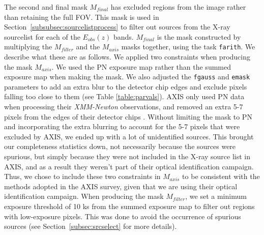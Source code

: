 \documentclass[fleqn,usenatbib]{mnras}
\begin{document}
        The second and final mask $M_{final}$ has excluded regions from the image rather than retaining the full FOV.
        This mask is used in Section~\ref{subsubsec:sourcelistprocess} to filter out sources from the X-ray sourcelist for each of the $E_{obs}(z)$ bands.
        $M_{final}$ is the mask constructed by multiplying the $M_{filter}$ and the $M_{axis}$ masks together, using the task \texttt{farith}.
        We describe what these are as follows.
        We applied two constraints when producing the mask $M_{axis}$.
        We used the PN exposure map rather than the summed exposure map when making the mask. 
        We also adjusted the \texttt{fgauss} and \texttt{emask} parameters to add an extra blur to the detector chip edges and exclude pixels falling too close to them (see Table \ref{table:parvals}). 
        AXIS only used PN data when processing their \textit{XMM-Newton} observations, and removed an extra 5-7 pixels from the edges of their detector chips \citep{carrera2007xmm}.
        Without limiting the mask to PN and incorporating the extra blurring to account for the 5-7 pixels that were excluded by AXIS, we ended up with a lot of unidentified sources. 
	    This brought our completeness statistics down, not necessarily because the sources were spurious, but simply because they were not included in the X-ray source list in AXIS, and as a result they weren't part of their optical identification campaign.
	    Thus, we chose to include these two constraints in $M_{axis}$ to be consistent with the methods adopted in the AXIS survey, given that we are using their optical identification campaign.
        When producing the mask $M_{filter}$, we set a minimum exposure threshold of 10 ks from the summed exposure map to filter out regions with low-exposure pixels.  
        This was done to avoid the occurrence of spurious sources (see Section~\ref{subsec:srcselect} for more details).
        
\end{document}
